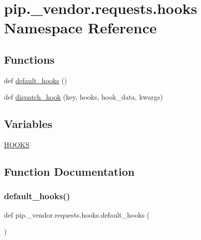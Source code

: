 \hypertarget{namespacepip_1_1__vendor_1_1requests_1_1hooks}{}\section{pip.\+\_\+vendor.\+requests.\+hooks Namespace Reference}
\label{namespacepip_1_1__vendor_1_1requests_1_1hooks}
\subsection*{Functions}
\begin{DoxyCompactItemize}
\item 
def \hyperlink{namespacepip_1_1__vendor_1_1requests_1_1hooks_a6199fcd8fe6670d622cbb61e89ab55e0}{default\+\_\+hooks} ()
\item 
def \hyperlink{namespacepip_1_1__vendor_1_1requests_1_1hooks_aa963c00b257a2f7894d15465995e0b89}{dispatch\+\_\+hook} (key, hooks, hook\+\_\+data, kwargs)
\end{DoxyCompactItemize}
\subsection*{Variables}
\begin{DoxyCompactItemize}
\item 
\hyperlink{namespacepip_1_1__vendor_1_1requests_1_1hooks_af7a13a0006e7579d06964f16417fb02b}{H\+O\+O\+KS}
\end{DoxyCompactItemize}


\subsection{Function Documentation}
\mbox{\label{namespacepip_1_1__vendor_1_1requests_1_1hooks_a6199fcd8fe6670d622cbb61e89ab55e0}} 
\subsubsection{\texorpdfstring{default\+\_\+hooks()}{default\_hooks()}}
{\footnotesize\ttfamily def pip.\+\_\+vendor.\+requests.\+hooks.\+default\+\_\+hooks (\begin{DoxyParamCaption}{ }\end{DoxyParamCaption})}

